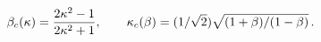 \begin{equation}\label{kc}
\beta_c(\kappa)={2\kappa^2-1\over2\kappa^2+1},
\qquad
\kappa_c (\beta) = (1/ \sqrt{2})\sqrt{(1 + \beta)/( 1- \beta)} \, .
\end{equation}

